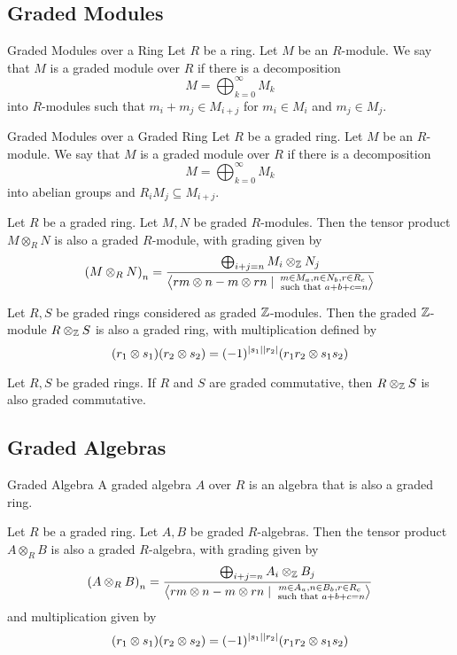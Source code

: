 \documentclass[a4paper]{article}
\begin{document}
\subsection{Graded Modules}
\begin{defn}{Graded Modules over a Ring}{} Let $R$ be a ring. Let $M$ be an $R$-module. We say that $M$ is a graded module over $R$ if there is a decomposition $$M=\bigoplus_{k=0}^\infty M_k$$ into $R$-modules such that $m_i+m_j\in M_{i+j}$ for $m_i\in M_i$ and $m_j\in M_j$. 
\end{defn}

\begin{defn}{Graded Modules over a Graded Ring}{} Let $R$ be a graded ring. Let $M$ be an $R$-module. We say that $M$ is a graded module over $R$ if there is a decomposition $$M=\bigoplus_{k=0}^\infty M_k$$ into abelian groups and $R_iM_j\subseteq M_{i+j}$. 
\end{defn}

\begin{prp}{}{} Let $R$ be a graded ring. Let $M,N$ be graded $R$-modules. Then the tensor product $M\otimes_RN$ is also a graded $R$-module, with grading given by $$\left(M\otimes_RN\right)_n=\frac{\bigoplus_{i+j=n}M_i\otimes_{\mathbb{Z}} N_j}{\left\langle rm\otimes n-m\otimes rn\;|\;\substack{m\in M_a, n\in N_b, r\in R_c\\\text{ such that }a+b+c=n}\right\rangle}$$
\end{prp}

\begin{prp}{}{} Let $R,S$ be graded rings considered as graded $\mathbb{Z}$-modules. Then the graded $\mathbb{Z}$-module $R\otimes_{\mathbb{Z}} S$ is also a graded ring, with multiplication defined by $$(r_1\otimes s_1)(r_2\otimes s_2)=(-1)^{\abs{s_1}\abs{r_2}}(r_1r_2\otimes s_1s_2)$$
\end{prp}

\begin{lmm}{}{} Let $R,S$ be graded rings. If $R$ and $S$ are graded commutative, then $R\otimes_{\mathbb{Z}} S$ is also graded commutative. 
\end{lmm}

\subsection{Graded Algebras}
\begin{defn}{Graded Algebra}{} A graded algebra $A$ over $R$ is an algebra that is also a graded ring. 
\end{defn}

\begin{prp}{}{} Let $R$ be a graded ring. Let $A,B$ be graded $R$-algebras. Then the tensor product $A\otimes_RB$ is also a graded $R$-algebra, with grading given by $$\left(A\otimes_RB\right)_n=\frac{\bigoplus_{i+j=n}A_i\otimes_{\mathbb{Z}} B_j}{\left\langle rm\otimes n-m\otimes rn\;|\;\substack{m\in A_a, n\in B_b, r\in R_c\\\text{ such that }a+b+c=n}\right\rangle}$$ and multiplication given by $$(r_1\otimes s_1)(r_2\otimes s_2)=(-1)^{\abs{s_1}\abs{r_2}}(r_1r_2\otimes s_1s_2)$$
\end{prp}
\end{document}
